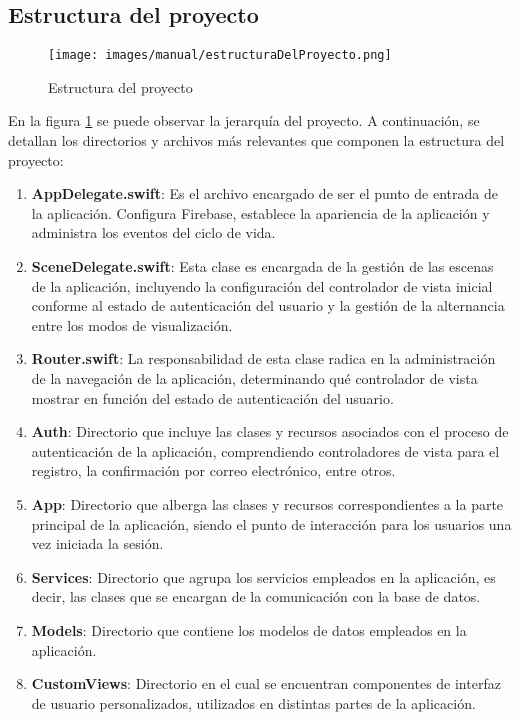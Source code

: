 \subsection{Estructura del proyecto}
\begin{figure}[H]
        \centering
        \texttt{[image: images/manual/estructuraDelProyecto.png]}
        \caption{Estructura del proyecto}
        \label{fig:estructuraProyecto}
\end{figure}
En la figura \ref{fig:estructuraProyecto} se puede observar la jerarquía del proyecto. A continuación, se detallan los directorios y archivos más relevantes que componen la estructura del proyecto:

\begin{enumerate}
        \item \textbf{AppDelegate.swift}: Es el archivo encargado de ser el punto de entrada de la aplicación. Configura Firebase, establece la apariencia de la aplicación y administra los eventos del ciclo de vida.
        \item \textbf{SceneDelegate.swift}: Esta clase es encargada de la gestión de las escenas de la aplicación, incluyendo la configuración del controlador de vista inicial conforme al estado de autenticación del usuario y la gestión de la alternancia entre los modos de visualización.
        \item \textbf{Router.swift}: La responsabilidad de esta clase radica en la administración de la navegación de la aplicación, determinando qué controlador de vista mostrar en función del estado de autenticación del usuario.
        \item \textbf{Auth}: Directorio que incluye las clases y recursos asociados con el proceso de autenticación de la aplicación, comprendiendo controladores de vista para el registro, la confirmación por correo electrónico, entre otros.
        \item \textbf{App}: Directorio que alberga las clases y recursos correspondientes a la parte principal de la aplicación, siendo el punto de interacción para los usuarios una vez iniciada la sesión.
        \item \textbf{Services}: Directorio que agrupa los servicios empleados en la aplicación, es decir, las clases que se encargan de la comunicación con la base de datos.
        \item \textbf{Models}: Directorio que contiene los modelos de datos empleados en la aplicación.
        \item \textbf{CustomViews}: Directorio en el cual se encuentran componentes de interfaz de usuario personalizados, utilizados en distintas partes de la aplicación.

\end{enumerate}
